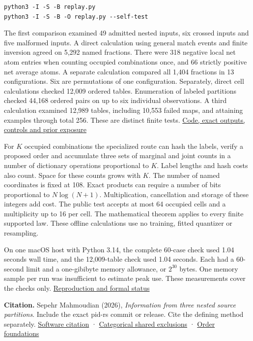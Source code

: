 \begin{verbatim}
python3 -I -S -B replay.py
python3 -I -S -B -O replay.py --self-test
\end{verbatim}

The first comparison examined 49 admitted nested inputs, six crossed inputs and five malformed inputs. A direct calculation using general match events and finite inversion agreed on 5,292 named fractions. There were 318 negative local net atom entries when counting occupied combinations once, and 66 strictly positive net average atoms. A separate calculation compared all 1,404 fractions in 13 configurations. Six are permutations of one configuration. Separately, direct cell calculations checked 12,009 ordered tables. Enumeration of labeled partitions checked 44,168 ordered pairs on up to six individual observations. A third calculation examined 12,989 tables, including 10,553 failed maps, and attaining examples through total 256. These are distinct finite tests. \href{https://github.com/sepahead/pid-rs/blob/main/audit/research/nested-categorical-sources/EVIDENCE.md}{Code, exact outputs, controls and prior exposure}

For \(K\) occupied combinations the specialized route can hash the labels, verify a proposed order and accumulate three sets of marginal and joint counts in a number of dictionary operations proportional to \(K\). Label lengths and hash costs also count. Space for these counts grows with \(K\). The number of named coordinates is fixed at 108. Exact products can require a number of bits proportional to \(N\log(N+1)\). Multiplication, cancellation and storage of these integers add cost. The public test accepts at most 64 occupied cells and a multiplicity up to 16 per cell. The mathematical theorem applies to every finite supported law. These offline calculations use no training, fitted quantizer or resampling.

On one macOS host with Python 3.14, the complete 60-case check used 1.04 seconds wall time, and the 12,009-table check used 1.04 seconds. Each had a 60-second limit and a one-gibibyte memory allowance, or \(2^{30}\) bytes. One memory sample per run was insufficient to estimate peak use. These measurements cover the checks only. \href{https://github.com/sepahead/pid-rs/blob/main/audit/research/nested-categorical-sources/EVIDENCE.md}{Reproduction and formal status}

\textbf{Citation.} Sepehr Mahmoudian (2026), \emph{Information from three nested source partitions}. Include the exact pid-rs commit or release. Cite the defining method separately. \href{https://github.com/sepahead/pid-rs/blob/main/CITATION.cff}{Software citation} · \href{https://doi.org/10.1103/PhysRevE.103.032149}{Categorical shared exclusions} · \href{https://doi.org/10.1098/rspa.2021.0110}{Order foundations}
